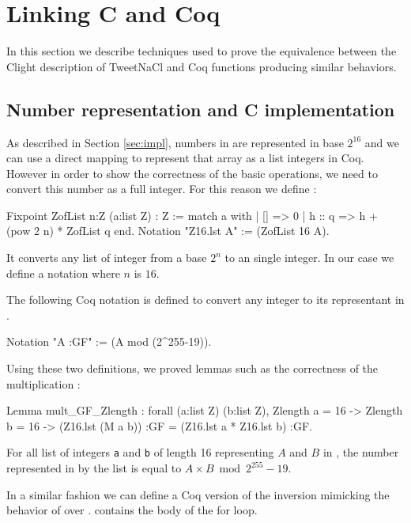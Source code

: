\section{Linking C and Coq}

In this section we describe techniques used to prove the equivalence between the
Clight description of TweetNaCl and Coq functions producing similar behaviors.

\subsection{Number representation and C implementation}

As described in Section \ref{sec:impl}, numbers in  are represented
in base $2^{16}$ and we can use a direct mapping to represent that array as a list
integers in Coq. However in order to show the correctness of the basic operations,
we need to convert this number as a full integer. For this reason we define
:
\begin{coqD}
Fixpoint ZofList {n:Z} (a:list Z) : Z :=
  match a with
  | [] => 0
  | h :: q => h + (pow 2 n) * ZofList q
  end.
Notation "Z16.lst A" := (ZofList 16 A).
\end{coqD}
It converts any list of integer from a base $2^n$ to an single integer. In our
case we define a notation where $n$ is $16$.

The following Coq notation is defined to convert any integer to its representant
in \Zfield.
\begin{coqD}
Notation "A :GF" := (A mod (2^255-19)).
\end{coqD}

Using these two definitions, we proved lemmas such as the correctness of the
multiplication :
\begin{coqD}
Lemma mult_GF_Zlength :
  forall (a:list Z) (b:list Z),
  Zlength a = 16 ->
  Zlength b = 16 ->
   (Z16.lst (M a b)) :GF =
   (Z16.lst a * Z16.lst b) :GF.
\end{coqD}

For all list of integers \texttt{a} and \texttt{b} of length 16 representing
$A$ and $B$ in \Zfield, the number represented in \Zfield by the list 
is equal to $A \times B \bmod 2^{255}-19$.

In a similar fashion we can define a Coq version of the inversion mimicking
the behavior of  over .  contains
the body of the for loop.


